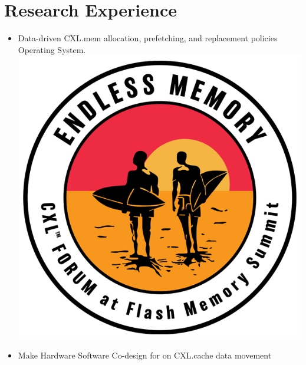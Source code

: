 \documentclass{resume}
\newcommand{\en}[1]{#1}
\newcommand{\zh}[1]{}
\begin{document}
\section{\en{Research Experience}\zh{研究经历}}

\en{}
\zh{\datedsubsection{\textbf{\href{https://www.ssrc.ucsc.edu/index.html}{加州大学圣克鲁兹分校存储中心}}}{08/2022 -- 现在}}
\en{}
\zh{\role{研究生科研}{助理}}
\begin{itemize}
      \item \small{ \en{Data-driven CXL.mem allocation, prefetching, and replacement policies Operating System. } \zh{设计CXL.mem的性能分析、数据驱动的远端内存分配、预取和替换策略的操作系统。}}\includegraphics[width=\linewidth/40]{cxl.png}
      \item \small{ \en{Make Hardware Software Co-design for on CXL.cache data movement}
}
\end{itemize}
\end{document}
